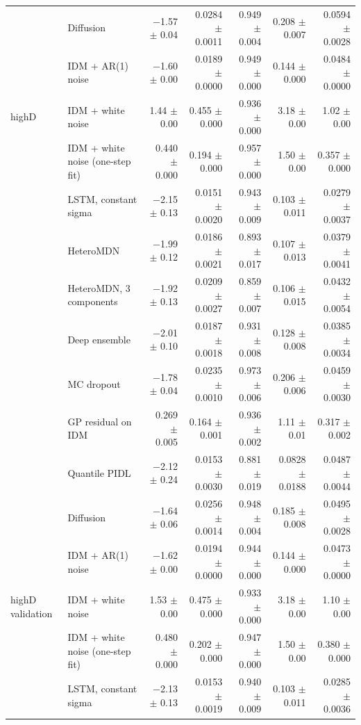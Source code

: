 \begin{longtable}{llrrrrr}
 & Diffusion & $-$1.57 $\pm$ 0.04 & 0.0284 $\pm$ 0.0011 & 0.949 $\pm$ 0.004 & 0.208 $\pm$ 0.007 & 0.0594 $\pm$ 0.0028 \\
 & IDM + AR(1) noise & $-$1.60 $\pm$ 0.00 & 0.0189 $\pm$ 0.0000 & 0.949 $\pm$ 0.000 & 0.144 $\pm$ 0.000 & 0.0484 $\pm$ 0.0000 \\
\midrule
highD & IDM + white noise & 1.44 $\pm$ 0.00 & 0.455 $\pm$ 0.000 & 0.936 $\pm$ 0.000 & 3.18 $\pm$ 0.00 & 1.02 $\pm$ 0.00 \\
 & IDM + white noise (one-step fit) & 0.440 $\pm$ 0.000 & 0.194 $\pm$ 0.000 & 0.957 $\pm$ 0.000 & 1.50 $\pm$ 0.00 & 0.357 $\pm$ 0.000 \\
 & LSTM, constant sigma & $-$2.15 $\pm$ 0.13 & 0.0151 $\pm$ 0.0020 & 0.943 $\pm$ 0.009 & 0.103 $\pm$ 0.011 & 0.0279 $\pm$ 0.0037 \\
 & HeteroMDN & $-$1.99 $\pm$ 0.12 & 0.0186 $\pm$ 0.0021 & 0.893 $\pm$ 0.017 & 0.107 $\pm$ 0.013 & 0.0379 $\pm$ 0.0041 \\
 & HeteroMDN, 3 components & $-$1.92 $\pm$ 0.13 & 0.0209 $\pm$ 0.0027 & 0.859 $\pm$ 0.007 & 0.106 $\pm$ 0.015 & 0.0432 $\pm$ 0.0054 \\
 & Deep ensemble & $-$2.01 $\pm$ 0.10 & 0.0187 $\pm$ 0.0018 & 0.931 $\pm$ 0.008 & 0.128 $\pm$ 0.008 & 0.0385 $\pm$ 0.0034 \\
 & MC dropout & $-$1.78 $\pm$ 0.04 & 0.0235 $\pm$ 0.0010 & 0.973 $\pm$ 0.006 & 0.206 $\pm$ 0.006 & 0.0459 $\pm$ 0.0030 \\
 & GP residual on IDM & 0.269 $\pm$ 0.005 & 0.164 $\pm$ 0.001 & 0.936 $\pm$ 0.002 & 1.11 $\pm$ 0.01 & 0.317 $\pm$ 0.002 \\
 & Quantile PIDL & $-$2.12 $\pm$ 0.24 & 0.0153 $\pm$ 0.0030 & 0.881 $\pm$ 0.019 & 0.0828 $\pm$ 0.0188 & 0.0487 $\pm$ 0.0044 \\
 & Diffusion & $-$1.64 $\pm$ 0.06 & 0.0256 $\pm$ 0.0014 & 0.948 $\pm$ 0.004 & 0.185 $\pm$ 0.008 & 0.0495 $\pm$ 0.0028 \\
 & IDM + AR(1) noise & $-$1.62 $\pm$ 0.00 & 0.0194 $\pm$ 0.0000 & 0.944 $\pm$ 0.000 & 0.144 $\pm$ 0.000 & 0.0473 $\pm$ 0.0000 \\
\midrule
highD validation & IDM + white noise & 1.53 $\pm$ 0.00 & 0.475 $\pm$ 0.000 & 0.933 $\pm$ 0.000 & 3.18 $\pm$ 0.00 & 1.10 $\pm$ 0.00 \\
 & IDM + white noise (one-step fit) & 0.480 $\pm$ 0.000 & 0.202 $\pm$ 0.000 & 0.947 $\pm$ 0.000 & 1.50 $\pm$ 0.00 & 0.380 $\pm$ 0.000 \\
 & LSTM, constant sigma & $-$2.13 $\pm$ 0.13 & 0.0153 $\pm$ 0.0019 & 0.940 $\pm$ 0.009 & 0.103 $\pm$ 0.011 & 0.0285 $\pm$ 0.0036 \\

\end{longtable}
